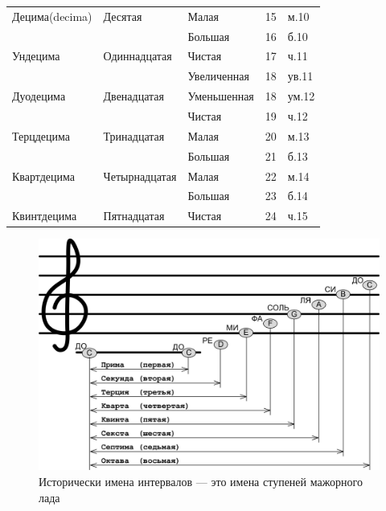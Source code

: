 \begin{table}[!ht]
\begin{tabular}{l|l|l|c|l}
        Децима(decima)     & Десятая            & Малая         & 15                & м.10 \\
                           &                    & Большая       & 16                & б.10 \\
        Ундецима           & Одиннадцатая       & Чистая        & 17                & ч.11 \\
                           &                    & Увеличенная   & 18                & ув.11\\
        Дуодецима          & Двенадцатая        & Уменьшенная   & 18                & ум.12\\
                           &                    & Чистая        & 19                & ч.12 \\
        Терцдецима         & Тринадцатая        & Малая         & 20                & м.13 \\
                           &                    & Большая       & 21                & б.13 \\
        Квартдецима        & Четырнадцатая      & Малая         & 22                & м.14 \\
                           &                    & Большая       & 23                & б.14 \\
        Квинтдецима        & Пятнадцатая        & Чистая        & 24                & ч.15 \\
        \hline\hline
    \end{tabular}
\end{table}

\begin{figure}[!ht]
    \centering
    \includegraphics[width=.9\textwidth]{fig/intervals/interval-names} 
    \caption{Исторически имена интервалов --- это имена ступеней мажорного лада}\label{fig:harmony:interval:names}
\end{figure} 

